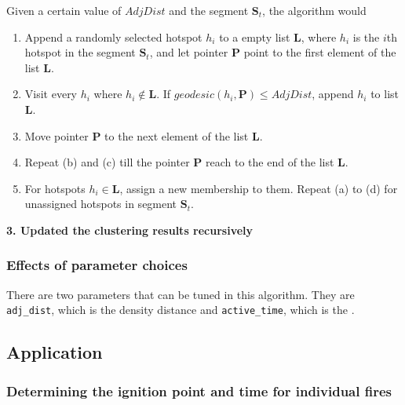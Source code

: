 Given a certain value of \(AdjDist\) and the segment
\(\boldsymbol{S}_t\), the algorithm would

\begin{enumerate}
\def\labelenumi{(\alph{enumi})}
\item
  Append a randomly selected hotspot \(h_i\) to a empty list
  \(\boldsymbol{L}\), where \(h_i\) is the \(i\)th hotspot in the
  segment \(\boldsymbol{S}_t\), and let pointer \(\boldsymbol{P}\) point
  to the first element of the list \(\boldsymbol{L}\).
\item
  Visit every \(h_i\) where \(h_i \notin \boldsymbol{L}\). If
  \(geodesic(h_i, \boldsymbol{P})\leq AdjDist\), append \(h_i\) to list
  \(\boldsymbol{L}\).
\item
  Move pointer \(\boldsymbol{P}\) to the next element of the list
  \(\boldsymbol{L}\).
\item
  Repeat (b) and (c) till the pointer \(\boldsymbol{P}\) reach to the
  end of the list \(\boldsymbol{L}\).
\item
  For hotspots \(h_i \in \boldsymbol{L}\), assign a new membership to
  them. Repeat (a) to (d) for unassigned hotspots in segment
  \(\boldsymbol{S}_t\).
\end{enumerate}

\textbf{3. Updated the clustering results recursively}

\hypertarget{effects-of-parameter-choices}{%
\subsubsection{Effects of parameter
choices}\label{effects-of-parameter-choices}}

There are two parameters that can be tuned in this algorithm. They are
\texttt{adj\_dist}, which is the density distance and
\texttt{active\_time}, which is the .

\hypertarget{application}{%
\subsection{Application}\label{application}}

\hypertarget{determining-the-ignition-point-and-time-for-individual-fires}{%
\subsubsection{Determining the ignition point and time for individual
fires}\label{determining-the-ignition-point-and-time-for-individual-fires}}

